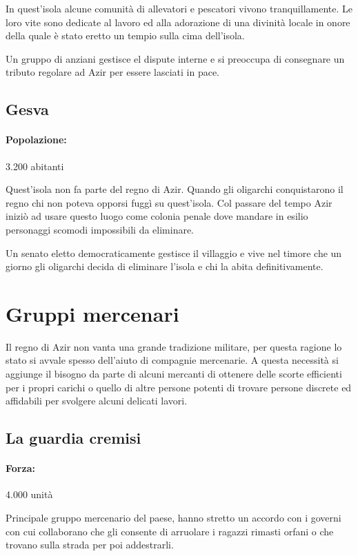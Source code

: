 \documentclass[letterpaper,twocolumn,openany,nodeprecatedcode]{dndbook}
\begin{document}
In quest'isola alcune comunità di allevatori e pescatori vivono tranquillamente. Le loro vite sono dedicate al lavoro ed alla adorazione di una divinità locale in onore della quale è stato eretto un tempio sulla cima dell'isola.

Un gruppo di anziani gestisce el dispute interne e si preoccupa di consegnare un tributo regolare ad Azir per essere lasciati in pace.

\subsection{Gesva}
\paragraph{Popolazione:} 3.200 abitanti

Quest'isola non fa parte del regno di Azir. Quando gli oligarchi conquistarono il regno chi non poteva opporsi fuggì su quest'isola. Col passare del tempo Azir iniziò ad usare questo luogo come colonia penale dove mandare in esilio personaggi scomodi impossibili da eliminare.

Un senato eletto democraticamente gestisce il villaggio e vive nel timore che un giorno gli oligarchi decida di eliminare l'isola e chi la abita definitivamente.

\section{Gruppi mercenari}
Il regno di Azir non vanta una grande tradizione militare, per questa ragione lo stato si avvale spesso dell'aiuto di compagnie mercenarie. A questa necessità si aggiunge il bisogno da parte di alcuni mercanti di ottenere delle scorte efficienti per i propri carichi o quello di altre persone potenti di trovare persone discrete ed affidabili per svolgere alcuni delicati lavori.

\subsection{La guardia cremisi}
\paragraph{Forza:} 4.000 unità

Principale gruppo mercenario del paese, hanno stretto un accordo con i governi con cui collaborano che gli consente di arruolare i ragazzi rimasti orfani o che trovano sulla strada per poi addestrarli.
\end{document}
